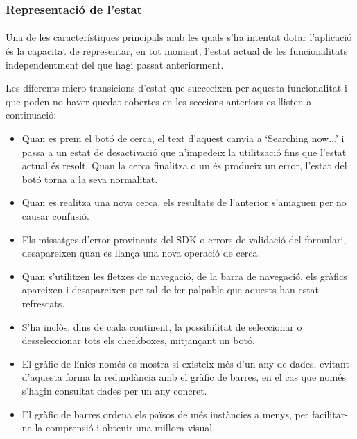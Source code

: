 \subsubsection{Representació de l'estat}

\paragraph{}
Una de les característiques principals amb les quals s'ha intentat dotar l'aplicació és la capacitat de representar, en tot moment, l'estat actual de les funcionalitats independentment del que hagi passat anteriorment.

Les diferents micro transicions d'estat que succeeixen per aquesta funcionalitat i que poden no haver quedat cobertes en les seccions anteriors es llisten a continuació:

\begin{itemize}
    \item Quan es prem el botó de cerca, el text d'aquest canvia a `Searching now...' i passa a un estat de desactivació que n'impedeix la utilització fins que l'estat actual és resolt. Quan la cerca finalitza o un és produeix un error, l'estat del botó torna a la seva normalitat.
    \item Quan es realitza una nova cerca, els resultats de l'anterior s'amaguen per no causar confusió.
    \item Els missatges d'error provinents del SDK o errors de validació del formulari, desapareixen quan es llança una nova operació de cerca.
    \item Quan s'utilitzen les fletxes de navegació, de la barra de navegació, els gràfics apareixen i desapareixen per tal de fer palpable que aquests han estat refrescats.
    \item S'ha inclòs, dins de cada continent, la possibilitat de seleccionar o desseleccionar tots els checkboxes, mitjançant un botó.
    \item El gràfic de línies només es mostra si existeix més d'un any de dades, evitant d’aquesta forma la redundància amb el gràfic de barres, en el cas que només s’hagin consultat dades per un any concret.
    \item El gràfic de barres ordena els països de més instàncies a menys, per facilitar-ne la comprensió i obtenir una millora visual.
\end{itemize}
